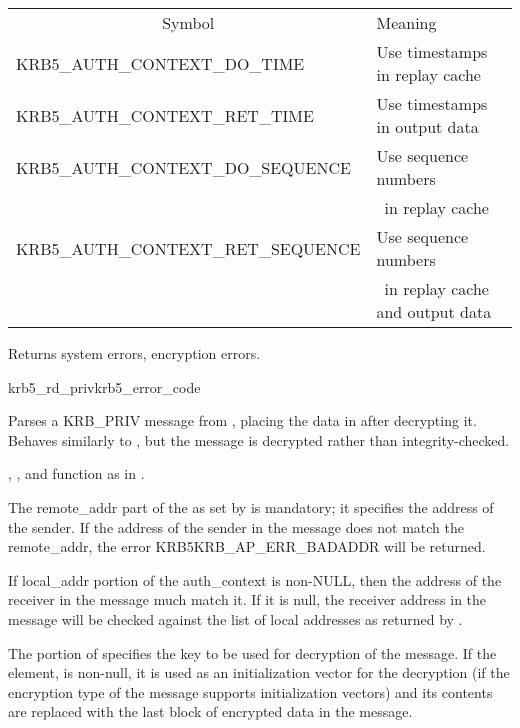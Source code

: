\begin{tabular}{ll}
\multicolumn{1}{c}{Symbol} & Meaning \\
KRB5_AUTH_CONTEXT_DO_TIME& Use timestamps in replay cache\\
KRB5_AUTH_CONTEXT_RET_TIME& Use timestamps in output data\\
KRB5_AUTH_CONTEXT_DO_SEQUENCE& Use sequence numbers\\
        &\ in replay cache\\
KRB5_AUTH_CONTEXT_RET_SEQUENCE& Use sequence numbers\\
        &\ in replay cache and output data \\
\end{tabular}

Returns system errors, encryption errors.

\begin{funcdecl}{krb5_rd_priv}{krb5_error_code}{\funcinout}
\funcin
{}
\funcout
{}
\end{funcdecl}

Parses a KRB_PRIV message from , placing the data in
 after decrypting it.  Behaves similarly to
, but the message is decrypted rather than
integrity-checked.

, , 
 and 
function as in .


The remote_addr part of the  as set by
 is mandatory;  it
specifies the address of the sender.  If the address of the sender in
the message does not match the remote_addr, the error
KRB5KRB_AP_ERR_BADADDR will be returned.

If local_addr portion of the auth_context is non-NULL, then the address
of the receiver in the message much match it.  If it is null, the
receiver address in the message will be checked against the list of
local addresses as returned by .

The  portion of  specifies
the key to be used for decryption of the message.  If the
 element, is non-null, it is used as an
initialization vector for the decryption (if the encryption type of the
message supports initialization vectors) and its contents are replaced
with the last block of encrypted data in the message.


